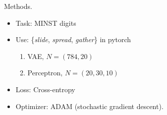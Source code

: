 \documentclass[10pt]{beamer}
\begin{document}

\begin{frame}[fragile]{Methods.}
\begin{itemize}
    \item \alert{Task}: MINST digits
    \item \alert{Use}: \{\textit{slide}, \textit{spread}, \textit{gather}\} in pytorch
    \begin{enumerate}
        \item VAE, $N=(784,20)$
        \item Perceptron, $N=(20,30,10)$    
    \end{enumerate}
    \item Loss: Cross-entropy
    \item Optimizer: ADAM (stochastic gradient descent).
\end{itemize}
\end{frame}
\end{document}
